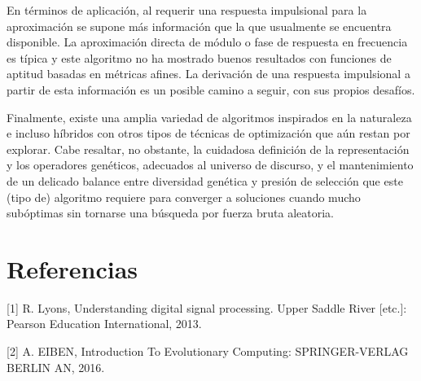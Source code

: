 \documentclass[11pt, journal]{IEEEtran}
\begin{document}
En términos de aplicación, al requerir una respuesta impulsional para la
aproximación se supone más información que la que usualmente se
encuentra disponible. La aproximación directa de módulo o fase de
respuesta en frecuencia es típica y este algoritmo no ha mostrado buenos
resultados con funciones de aptitud basadas en métricas afines. La
derivación de una respuesta impulsional a partir de esta información es
un posible camino a seguir, con sus propios desafíos.

Finalmente, existe una amplia variedad de algoritmos inspirados en la
naturaleza e incluso híbridos con otros tipos de técnicas de
optimización que aún restan por explorar. Cabe resaltar, no obstante, la
cuidadosa definición de la representación y los operadores genéticos,
adecuados al universo de discurso, y el mantenimiento de un delicado
balance entre diversidad genética y presión de selección que este (tipo
de) algoritmo requiere para converger a soluciones cuando mucho
subóptimas sin tornarse una búsqueda por fuerza bruta aleatoria.

\section{Referencias}

{[}1{]} R. Lyons, Understanding digital signal processing. Upper Saddle
River {[}etc.{]}: Pearson Education International, 2013.

{[}2{]} A. EIBEN, Introduction To Evolutionary Computing:
SPRINGER-VERLAG BERLIN AN, 2016.

    
    
\end{document}
